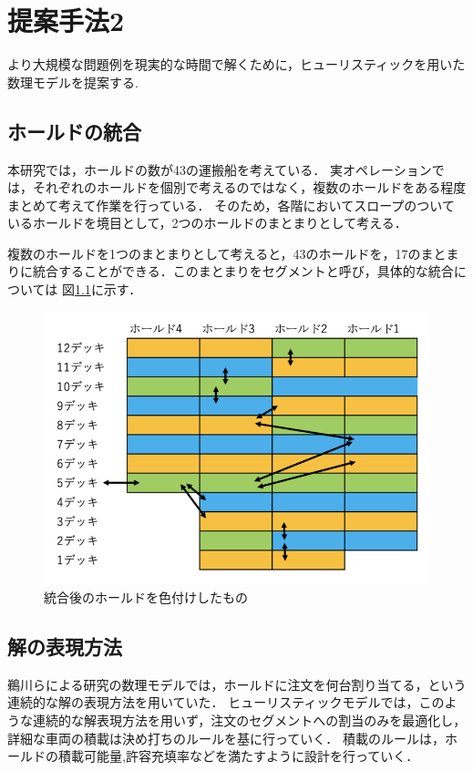 \chapter{提案手法2}\label{method2}
より大規模な問題例を現実的な時間で解くために，ヒューリスティックを用いた数理モデルを提案する.

\section{ホールドの統合}
本研究では，ホールドの数が43の運搬船を考えている．
実オペレーションでは，それぞれのホールドを個別で考えるのではなく，複数のホールドをある程度まとめて考えて作業を行っている．
そのため，各階においてスロープのついているホールドを境目として，2つのホールドのまとまりとして考える．

複数のホールドを1つのまとまりとして考えると，43のホールドを，17のまとまりに統合することができる．このまとまりをセグメントと呼び，具体的な統合については
図\ref{fig1}に示す．\\

\begin{figure}[H]
 \centering
 \includegraphics[slace=0.2]{segment.png}
 \caption{統合後のホールドを色付けしたもの}
 \label{fig1}
\end{figure}



\section{解の表現方法}
鵜川らによる研究の数理モデル\cite{ukawa}では，ホールドに注文を何台割り当てる，という連続的な解の表現方法を用いていた．
ヒューリスティックモデルでは，このような連続的な解表現方法を用いず，注文のセグメントへの割当のみを最適化し，詳細な車両の積載は決め打ちのルールを基に行っていく．
積載のルールは，ホールドの積載可能量,許容充填率などを満たすように設計を行っていく．

